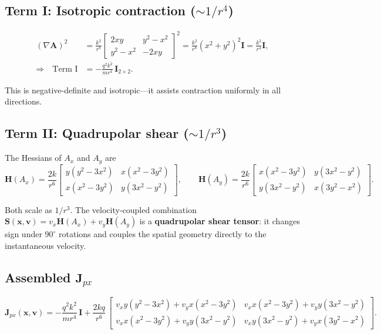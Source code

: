 \documentclass[11pt]{article}
\begin{document}
\subsection{Term I: Isotropic contraction ($\sim 1/r^4$)}
\label{sec:termI}

\begin{align}
(\nabla\mathbf{A})^2 &= \frac{k^2}{r^8}
\begin{bmatrix} 2xy & y^2-x^2 \\ y^2-x^2 & -2xy \end{bmatrix}^2
= \frac{k^2}{r^8} (x^2+y^2)^2 \mathbf{I}
= \frac{k^2}{r^4}\mathbf{I}, \label{eq:gradA2}\\
\Longrightarrow\quad \text{Term I} &= -\frac{q^2 k^2}{m r^4}\,\mathbf{I}_{2\times 2}. \label{eq:termI}
\end{align}

This is negative-definite and isotropic---it assists contraction uniformly in all
directions.

\subsection{Term II: Quadrupolar shear ($\sim 1/r^3$)}
\label{sec:termII}

The Hessians of $A_x$ and $A_y$ are
\[
\mathbf{H}(A_x) = \frac{2k}{r^6}
\begin{bmatrix}
y(y^2-3x^2) & x(x^2-3y^2) \\
x(x^2-3y^2) & y(3x^2-y^2)
\end{bmatrix},\qquad
\mathbf{H}(A_y) = \frac{2k}{r^6}
\begin{bmatrix}
x(x^2-3y^2) & y(3x^2-y^2) \\
y(3x^2-y^2) & x(3y^2-x^2)
\end{bmatrix}.
\]

Both scale as $1/r^3$. The velocity-coupled combination
$\mathbf{S}(\mathbf{x}, \mathbf{v}) = v_x \mathbf{H}(A_x) + v_y \mathbf{H}(A_y)$
is a \textbf{quadrupolar shear tensor}: it changes sign under $90^\circ$ rotations
and couples the spatial geometry directly to the instantaneous velocity.

\subsection{Assembled $\mathbf{J}_{px}$}
\label{sec:assembled}

\[
\boxed{\mathbf{J}_{px}(\mathbf{x}, \mathbf{v})
= -\frac{q^2 k^2}{m r^4}\,\mathbf{I}
+ \frac{2kq}{r^6}\,
\begin{bmatrix}
v_x y(y^2-3x^2) + v_y x(x^2-3y^2) & v_x x(x^2-3y^2) + v_y y(3x^2-y^2) \\[4pt]
v_x x(x^2-3y^2) + v_y y(3x^2-y^2) & v_x y(3x^2-y^2) + v_y x(3y^2-x^2)
\end{bmatrix}.}
\]
\end{document}
